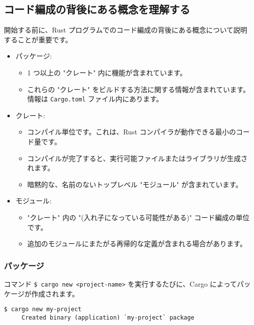 \subsection{コード編成の背後にある概念を理解する}

開始する前に、Rust プログラムでのコード編成の背後にある概念について説明することが重要です。

\begin{itemize}
\item パッケージ:
\begin{itemize}
\item 1 つ以上の "クレート" 内に機能が含まれています。
\item これらの "クレート" をビルドする方法に関する情報が含まれています。 情報は \texttt{Cargo.toml} ファイル内にあります。
\end{itemize}

\item クレート:

\begin{itemize}
\item コンパイル単位です。これは、Rust コンパイラが動作できる最小のコード量です。
\item コンパイルが完了すると、実行可能ファイルまたはライブラリが生成されます。
\item 暗黙的な、名前のないトップレベル "モジュール" が含まれています。
\end{itemize}

\item モジュール:

\begin{itemize}
\item "クレート" 内の "(入れ子になっている可能性がある)" コード編成の単位です。
\item 追加のモジュールにまたがる再帰的な定義が含まれる場合があります。
\end{itemize}

\end{itemize}


\subsubsection{パッケージ}

コマンド \texttt{\$ cargo new <project-name>} を実行するたびに、Cargo によってパッケージが作成されます。

\begin{lstlisting}[numbers=none]
$ cargo new my-project
     Created binary (application) `my-project` package
\end{lstlisting}

